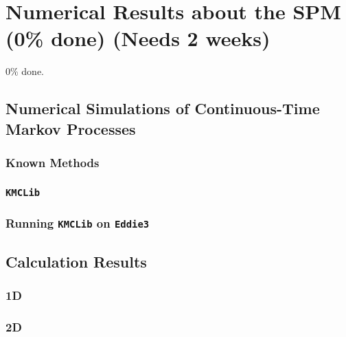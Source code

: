 \chapter{Numerical Results about the SPM (0\% done) (Needs 2 weeks)}

0\% done.

\section{Numerical Simulations of Continuous-Time Markov Processes}
\subsection{Known Methods}
\subsection{\texttt{KMCLib}}
\subsection{Running \texttt{KMCLib} on \texttt{Eddie3}}

\section{Calculation Results }
\subsection{1D}
\subsection{2D}